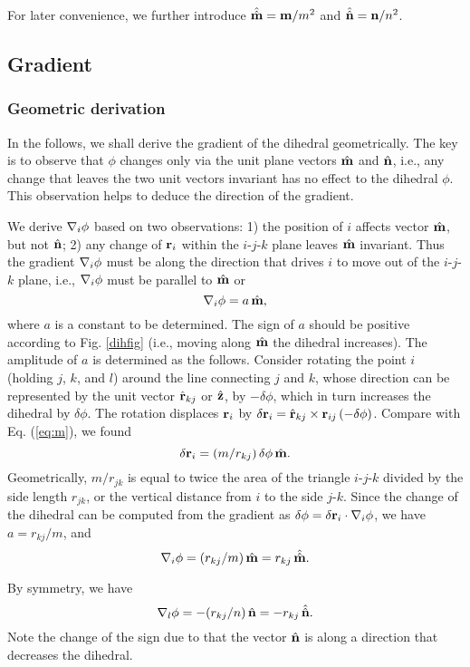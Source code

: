 \documentclass{article}
\begin{document}
For later convenience, we further introduce
$\hat{\hat{\mathbf{m}}} = \mathbf{m}/m^2$ and $\hat{\hat{\mathbf{n}}} = \mathbf{n}/n^2$.




\subsection{Gradient}

\subsubsection{Geometric derivation}

In the follows, we shall derive the gradient of the dihedral geometrically.
%
The key is to observe that $\phi$ changes only via the unit plane vectors $\hat{\mathbf{m}}$ and $\hat{\mathbf{n}}$,
i.e., any change that leaves the two unit vectors invariant has no effect to 
the dihedral $\phi$.
This observation helps to deduce the direction of the gradient.

We derive $\nabla_i \phi$ based on two observations: 
1) the position of $i$ affects vector $\hat{\mathbf{m}}$, but not $\hat{\mathbf{n}}$;
2) any change of $\mathbf{r}_i$ within the $i$-$j$-$k$ plane leaves $\hat{\mathbf{m}}$ invariant.
%
Thus the gradient $\nabla_i \phi$ must be along the direction that 
    drives $i$ to move out of the $i$-$j$-$k$ plane,
i.e., $\nabla_i \phi$ must be parallel to $\hat{\mathbf{m}}$ or 
\[
\nabla_i \phi  = a \, \hat{\mathbf{m}},
\]
where $a$ is a constant to be determined.
%
The sign of $a$ should be positive according to Fig. \ref{dihfig} (i.e., moving along $\hat{\mathbf{m}}$ the dihedral increases).
%
The amplitude of $a$ is determined as the follows.
Consider rotating the point $i$ (holding $j$, $k$, and $l$) around 
the line connecting $j$ and $k$, whose direction can be represented by the unit vector $\hat{\mathbf{r}}_{kj}$ or $\hat{\mathbf{z}}$,
by $-\delta \phi$, which in turn increases the dihedral by $\delta \phi$.
The rotation displaces $\mathbf{r}_i$  by
$\delta \mathbf{r}_i = \hat{\mathbf{r}}_{kj} \times \mathbf{r}_{ij} \, (-\delta \phi)$.
Compare with Eq. (\ref{eq:m}), we found 
\[
 \delta \mathbf{r}_i =  (m/r_{kj}) \, \delta \phi \, \hat{\mathbf{m}}.
\]
Geometrically, $m/r_{jk}$ is equal to twice the area of the triangle $i$-$j$-$k$
 divided by the side length $r_{jk}$,
or the vertical distance from $i$ to the side $j$-$k$.
%
%
Since the change of the dihedral can be computed from the gradient as 
$\delta \phi = \delta \mathbf{r}_i \cdot \nabla_i \phi $, we have 
$a = r_{kj}/m$, and 
\[
\nabla_i \phi = (r_{kj}/m) \, \hat{\mathbf{m}} = r_{kj} \, \hat{\hat{\mathbf{m}}}.
\]

By symmetry, we have
\[
\nabla_l \phi = -(r_{kj}/n) \, \hat{\mathbf{n}} = -r_{kj} \, \hat{\hat{\mathbf{n}}}.
\]
Note the change of the sign due to that 
the vector $\hat{\mathbf{n}}$ is along a direction that decreases the dihedral.
\end{document}
